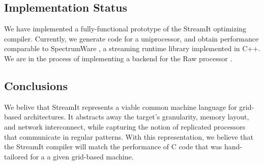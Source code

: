 \documentclass{sig-alternate}
\begin{document}
\subsection{Implementation Status}

We have implemented a fully-functional prototype of the StreamIt
optimizing compiler.  Currently, we generate code for a uniprocessor,
and obtain performance comparable to SpectrumWare \cite{spectrumware},
a streaming runtime library implemented in C++.  We are in the process
of implementing a backend for the Raw processor \cite{raw}.

\subsection{Conclusions}

We belive that StreamIt represents a viable common machine language
for grid-based architectures.  It abstracts away the target's
granularity, memory layout, and network interconnect, while capturing
the notion of replicated processors that communicate in regular
patterns.  With this representation, we believe that the StreamIt
compiler will match the performance of C code that was hand-tailored
for a a given grid-based machine.


\begin{small}


\end{small}
\end{document}
